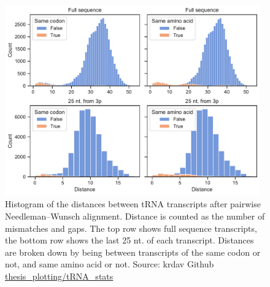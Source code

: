 \begin{figure}
    \centering
    \includegraphics[width=0.98\textwidth]{figures/chap4/tRNA_dist_hist.pdf}
    \caption[Pairwise tRNA distance histogram]{Histogram of the distances between tRNA transcripts after pairwise Needleman–Wunsch alignment.
    Distance is counted as the number of mismatches and gaps.
    The top row shows full sequence transcripts, the bottom row shows the last 25 nt. of each transcript.
    Distances are broken down by being between transcripts of the same codon or not, and same amino acid or not. Source: krdav Github \href{https://github.com/krdav/thesis_plotting/blob/main/tRNA_stats/plot_data.ipynb}{thesis\_plotting/tRNA\_stats}}
    \label{fig:dist_hist}
\end{figure}





